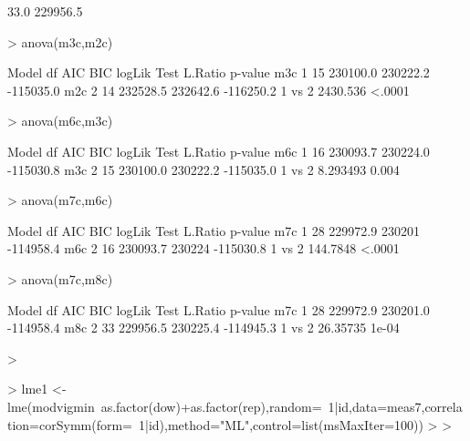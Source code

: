 \documentclass[11pt]{article}
\begin{document}
\begin{Schunk}
\begin{Soutput}
[1]     33.0 229956.5
\end{Soutput}
\begin{Sinput}
> anova(m3c,m2c)
\end{Sinput}
\begin{Soutput}
    Model df      AIC      BIC    logLik   Test  L.Ratio p-value
m3c     1 15 230100.0 230222.2 -115035.0                        
m2c     2 14 232528.5 232642.6 -116250.2 1 vs 2 2430.536  <.0001
\end{Soutput}
\begin{Sinput}
> anova(m6c,m3c)
\end{Sinput}
\begin{Soutput}
    Model df      AIC      BIC    logLik   Test  L.Ratio p-value
m6c     1 16 230093.7 230224.0 -115030.8                        
m3c     2 15 230100.0 230222.2 -115035.0 1 vs 2 8.293493   0.004
\end{Soutput}
\begin{Sinput}
> anova(m7c,m6c)
\end{Sinput}
\begin{Soutput}
    Model df      AIC    BIC    logLik   Test  L.Ratio p-value
m7c     1 28 229972.9 230201 -114958.4                        
m6c     2 16 230093.7 230224 -115030.8 1 vs 2 144.7848  <.0001
\end{Soutput}
\begin{Sinput}
> anova(m7c,m8c)
\end{Sinput}
\begin{Soutput}
    Model df      AIC      BIC    logLik   Test  L.Ratio p-value
m7c     1 28 229972.9 230201.0 -114958.4                        
m8c     2 33 229956.5 230225.4 -114945.3 1 vs 2 26.35735   1e-04
\end{Soutput}
\begin{Sinput}
> 
\end{Sinput}
\end{Schunk}

\begin{Schunk}
\begin{Sinput}
> lme1 <- lme(modvigmin~as.factor(dow)+as.factor(rep),random=~1|id,data=meas7,correlation=corSymm(form=~1|id),method="ML",control=list(msMaxIter=100))
> 
> 
\end{Sinput}
\end{Schunk}
\end{document}
